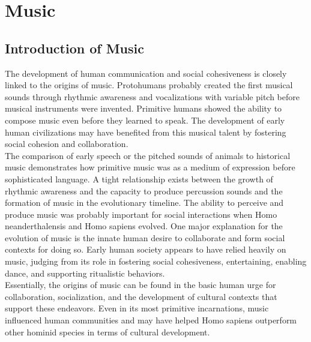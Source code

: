 \section{Music}
\subsection{Introduction of Music}
The development of human communication and social cohesiveness is closely linked to the origins of music. 
Protohumans probably created the first musical sounds through rhythmic awareness and vocalizations with variable pitch before musical instruments were invented. 
Primitive humans showed the ability to compose music even before they learned to speak. 
The development of early human civilizations may have benefited from this musical talent by fostering social cohesion and collaboration.
\\
\indent The comparison of early speech or the pitched sounds of animals to historical music demonstrates how primitive music was as a medium of expression before sophisticated language. 
A tight relationship exists between the growth of rhythmic awareness and the capacity to produce percussion sounds and the formation of music in the evolutionary timeline.
The ability to perceive and produce music was probably important for social interactions when Homo neanderthalensis and Homo sapiens evolved.
One major explanation for the evolution of music is the innate human desire to collaborate and form social contexts for doing so. 
Early human society appears to have relied heavily on music, judging from its role in fostering social cohesiveness, entertaining, enabling dance, and supporting ritualistic behaviors.
\\
\indent Essentially, the origins of music can be found in the basic human urge for collaboration, socialization, and the development of cultural contexts that support these endeavors. 
Even in its most primitive incarnations, music influenced human communities and may have helped Homo sapiens outperform other hominid species in terms of cultural development.

